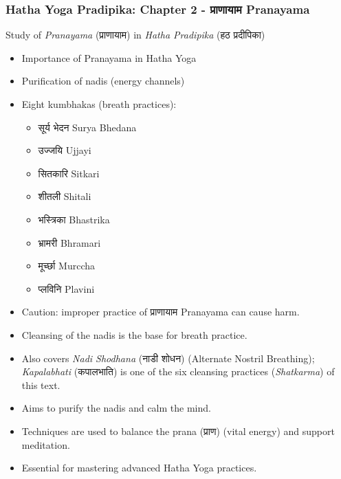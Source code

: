
\begin{frame}[fragile,shrink=6]\frametitle{Hatha Yoga Pradipika: Chapter 2 - प्राणायाम  Pranayama}
Study of \textit{Pranayama} (प्राणायाम) in \textit{Hatha Pradipika} (हठ प्रदीपिका)

\begin{itemize}
    \item Importance of Pranayama in Hatha Yoga
    \item Purification of nadis (energy channels)
    \item Eight kumbhakas (breath practices):
    \begin{itemize}
        \item सूर्य भेदन Surya Bhedana
        \item उज्जयि Ujjayi
        \item सितकारि Sitkari
        \item शीतली Shitali
        \item भस्त्रिका Bhastrika
        \item भ्रामरी Bhramari
        \item मूर्च्छा Murccha
        \item प्लविनि Plavini
    \end{itemize}
    \item Caution: improper practice of प्राणायाम Pranayama can cause harm.
	\item Cleansing of the nadis is the base for breath practice.
	\item Also covers \textit{Nadi Shodhana} (नाडी शोधन) (Alternate Nostril Breathing); \textit{Kapalabhati} (कपालभाति) is one of the six cleansing practices (\textit{Shatkarma}) of this text.
	\item Aims to purify the nadis and calm the mind.
	\item Techniques are used to balance the prana (प्राण) (vital energy) and support meditation.
	\item Essential for mastering advanced Hatha Yoga practices.
  \end{itemize}

\end{frame}


